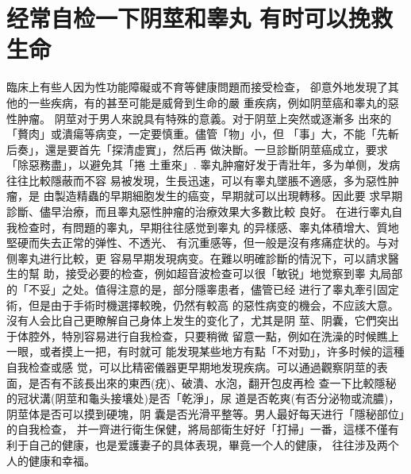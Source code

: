 \documentclass[12pt,UTF8]{ctexbook}
\begin{document}
\section{经常自检一下阴莖和睾丸
有时可以挽救生命}
臨床上有些人因为性功能障礙或不育等健康問題而接受检查，
卻意外地发現了其他的一些疾病，有的甚至可能是威脅到生命的嚴
重疾病，例如阴莖癌和睾丸的惡性肿瘤。
阴莖对于男人來說具有特殊的意義。对于阴莖上突然或逐漸多
出來的「贅肉」或潰瘍等病变，一定要慎重。儘管「物」小，但
「事」大，不能「先斬后奏」，還是要首先「探清虚實」，然后再
做決斷。一旦診斷阴莖癌成立，要求「除惡務盡」，以避免其「捲
土重來」.
睾丸肿瘤好发于青壯年，多为单侧，发病往往比較隱蔽而不容
易被发現，生長迅速，可以有睾丸墜脹不適感，多为惡性肿瘤，是
由製造精蟲的早期細胞发生的癌变，早期就可以出現轉移。因此要
求早期診斷、儘早治療，而且睾丸惡性肿瘤的治療效果大多數比較
良好。
在进行睾丸自我检查时，有問題的睾丸，早期往往感觉到睾丸
的异樣感、睾丸体積增大、質地堅硬而失去正常的弹性、不透光、
有沉重感等，但一般是沒有疼痛症状的。与对侧睾丸进行比較，更
容易早期发現病变。在難以明確診斷的情況下，可以請求醫生的幫
助，接受必要的检查，例如超音波检查可以很「敏锐」地觉察到睾
丸局部的「不妥」之处。值得注意的是，部分隱睾患者，儘管已经
进行了睾丸牽引固定術，但是由于手術时機選擇較晚，仍然有較高
的惡性病变的機会，不应該大意。
沒有人会比自己更瞭解自己身体上发生的变化了，尤其是阴
莖、阴囊，它們突出于体腔外，特別容易进行自我检查，只要稍微
留意一點，例如在洗澡的时候瞧上一眼，或者摸上一把，有时就可
能发現某些地方有點「不对勁」，许多时候的這種自我检查或感
觉，可以比精密儀器更早期地发現疾病。可以通過觀察阴莖的表
面，是否有不該長出來的東西(疣)、破潰、水泡，翻开包皮再检
查一下比較隱秘的冠状溝(阴莖和龜头接壤处)是否「乾淨」，尿
道是否乾爽(有否分泌物或流膿)，阴莖体是否可以摸到硬塊，阴
囊是否光滑平整等。男人最好每天进行「隱秘部位」的自我检查，
并一齊进行衛生保健，將局部衛生好好「打掃」一番，這樣不僅有
利于自己的健康，也是爱護妻子的具体表現，畢竟一个人的健康，
往往涉及两个人的健康和幸福。
\end{document}
